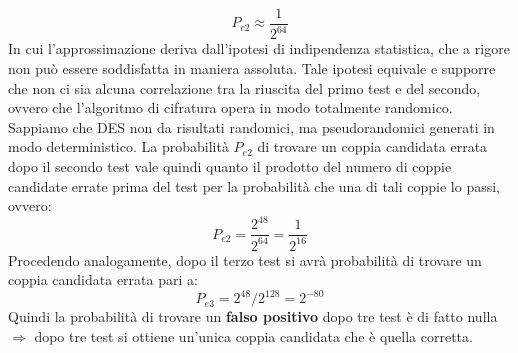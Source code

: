 \begin{equation}
P_{c2} \approx \frac{1}{2^{64}}
\end{equation}
In cui l'approssimazione deriva dall'ipotesi di indipendenza statistica, che a rigore non può essere soddisfatta in maniera assoluta. Tale ipotesi equivale e supporre che non ci sia alcuna correlazione tra la riuscita del primo test e del secondo, ovvero che l'algoritmo di cifratura opera in modo totalmente randomico. Sappiamo che DES non da risultati randomici, ma pseudorandomici generati in modo deterministico.
\newline \newline
La probabilità $P_{e2}$ di trovare un coppia candidata errata dopo il secondo test vale quindi quanto il prodotto del numero di coppie candidate errate prima del test per la probabilità che una di tali coppie lo passi, ovvero:
\begin{equation}
P_{e2} = \frac{2^{48}}{2^{64}} = \frac{1}{2^{16}} 
\end{equation} 
Procedendo analogamente, dopo il terzo test si avrà probabilità di trovare un coppia candidata errata pari a:
\begin{equation}
P_{e3} = 2^{48} / 2^{128} = 2^{-80}
\end{equation}
Quindi la probabilità di trovare un \textbf{falso positivo} dopo tre test è di fatto nulla $\Rightarrow$ dopo tre test si ottiene un'unica coppia candidata che è quella corretta.

